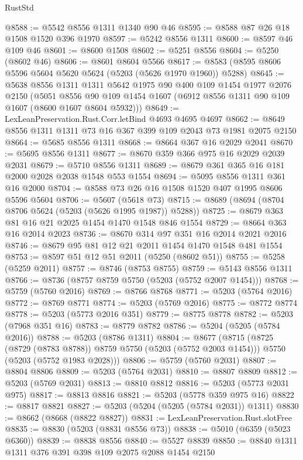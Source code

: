 \begin{lexlean}{RustStd}
\begin{coremodule}
@8588 := @5542 @8556 @1311 @1340 @90 @46
@8595 := @8588 @87 @26 @18 @1508 @1520 @396 @1970
@8597 := @5242 @8556 @1311
@8600 := @8597 @46 @109 @46
@8601 := @8600 @1508
@8602 := @5251 @8556
@8604 := @5250 (@8602 @46)
@8606 := @8601 @8604 @5566
@8617 := @8583 (@8595 @8606 @5596 @5604 @5620 @5624 (@5203 (@5626 @1970 @1960)) @5288)
@8645 := @5638
    @8556
    @1311
    @1311
    @5642
    @1975
    @90
    @400
    @109
    @1454
    @1977
    @2076
    @2150
    (@5051 @8556 @90 @109 @1454 @1607 (@6912 @8556 @1311 @90 @109 @1607 (@8600 @1607 @8604 @5932)))
@8649 := LexLeanPreservation.Rust.Corr.letBind @4693 @4695 @4697
@8662 := @8649 @8556 @1311 @1311 @73 @16 @367 @399 @109 @2043 @73 @1981 @2075 @2150
@8664 := @5685 @8556 @1311
@8668 := @8664 @367 @16 @2029 @2041
@8670 := @5695 @8556 @1311
@8677 := @8670 @359 @366 @975 @16 @2029 @2039 @2031
@8679 := @5710 @8556 @1311
@8689 := @8679 @361 @365 @16 @181 @2000 @2028 @2038 @1548 @553 @1554
@8694 := @5095 @8556 @1311 @361 @16 @2000
@8704 := @8588 @73 @26 @16 @1508 @1520 @407 @1995 @8606 @5596 @5604
@8706 := @5607 (@5618 @73)
@8715 := @8689 (@8694 (@8704 @8706 @5624 (@5203 (@5626 @1995 @1987)) @5288))
@8725 := @8679 @363 @81 @16 @21 @2025 @1454 @1470 @1548 @846 @1554
@8729 := @8664 @363 @16 @2014 @2023
@8736 := @8670 @314 @97 @351 @16 @2014 @2021 @2016
@8746 := @8679 @95 @81 @12 @21 @2011 @1454 @1470 @1548 @481 @1554
@8753 := @8597 @51 @12 @51 @2011 (@5250 (@8602 @51))
@8755 := @5258 (@5259 @2011)
@8757 := @8746 (@8753 @8755)
@8759 := @5143 @8556 @1311
@8766 := @8736 (@8757 @8759 @5750 (@5203 (@5752 @2007 @1454)))
@8768 := @5759 (@5760 @2016)
@8769 := @8766 @8768
@8771 := @5203 (@5764 @2016)
@8772 := @8769 @8771
@8774 := @5203 (@5769 @2016)
@8775 := @8772 @8774
@8778 := @5203 (@5773 @2016 @351)
@8779 := @8775 @8778
@8782 := @5203 (@7968 @351 @16)
@8783 := @8779 @8782
@8786 := @5204 (@5205 (@5784 @2016))
@8788 := @5203 (@8786 @1311)
@8804 := @8677
    (@8715
      (@8725 (@8729 (@8783 @8788)) @8759 @5750 (@5203 (@5752 @2003 @1454)))
      @5750
      (@5203 (@5752 @1983 @2028)))
@8806 := @5759 (@5760 @2031)
@8807 := @8804 @8806
@8809 := @5203 (@5764 @2031)
@8810 := @8807 @8809
@8812 := @5203 (@5769 @2031)
@8813 := @8810 @8812
@8816 := @5203 (@5773 @2031 @975)
@8817 := @8813 @8816
@8821 := @5203 (@5778 @359 @975 @16)
@8822 := @8817 @8821
@8827 := @5203 (@5204 (@5205 (@5784 @2031)) @1311)
@8830 := @8662 (@8668 (@8822 @8827))
@8831 := LexLeanPreservation.Rust.slotFree
@8835 := @8830 (@5203 (@8831 @8556 @73))
@8838 := @5010 (@6359 (@5023 @6360))
@8839 := @8838 @8556
@8840 := @5527 @8839
@8850 := @8840 @1311 @1311 @376 @391 @398 @109 @2075 @2088 @1454 @2150

\end{coremodule}
\end{lexlean}
